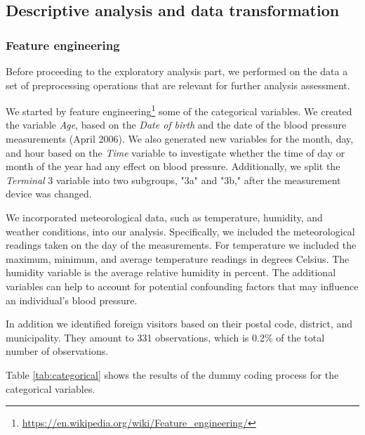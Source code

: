 \documentclass[12 pt]{scrartcl}
\numberwithin{equation}{section}
\begin{document}
\subsection{Descriptive analysis and data transformation}
\label{subsec:Descriptive analysis and data transformation}

\subsubsection*{Feature engineering}

Before proceeding to the exploratory analysis part, 
we performed on the data a set of preprocessing operations 
that are relevant for further analysis assessment.

We started by feature engineering\footnote{\url{https://en.wikipedia.org/wiki/Feature_engineering/}} 
some of the categorical variables. We created the variable \textit{Age}, based on the \textit{Date of birth} and the date of the blood pressure measurements (April 2006). 
We also generated new variables for the month, day, and hour based on the \textit{Time} variable to investigate 
whether the time of day or month of the year had any effect on blood pressure. 
Additionally, we split the \textit{Terminal} 3 variable into two subgroups, "3a" and "3b," after the measurement device was changed.

We incorporated meteorological data, such as temperature, humidity, and weather conditions, 
into our analysis. Specifically, we included the meteorological readings taken on the day of the measurements. 
For temperature we included the maximum, minimum, and average temperature readings in degrees Celsius.   
The humidity variable is the average relative humidity in percent. 
The additional variables can help to account for potential 
confounding factors that may influence an individual's blood pressure.

In addition we identified foreign visitors 
based on their postal code, district, and municipality. They amount to 331 observations,
which is 0.2\% of the total number of observations.

Table \ref{tab:categorical} shows the results of the dummy coding process for the categorical variables.
  
\end{document}
